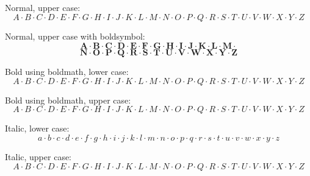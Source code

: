 \documentclass[12pt,a4paper]{article}
\theoremstyle{clearprint}
\begin{document}
\noindent 
Normal, upper case:
\begin{equation}
A \cdot B \cdot C \cdot D \cdot E \cdot F \cdot G \cdot H \cdot I \cdot J \cdot K \cdot L \cdot M \cdot N \cdot O \cdot P \cdot Q \cdot R \cdot S \cdot T \cdot U \cdot V \cdot W \cdot X \cdot Y \cdot Z
\end{equation}

\noindent 
Normal, upper case with boldsymbol:
\begin{equation}
\boldsymbol{A \cdot B \cdot C \cdot D \cdot E \cdot F \cdot G \cdot H \cdot I \cdot J \cdot K \cdot L \cdot M \cdot }
\end{equation}
\begin{equation}
\boldsymbol{N \cdot O \cdot P \cdot Q \cdot R \cdot S \cdot T \cdot U \cdot V \cdot W \cdot X \cdot Y \cdot Z}
\end{equation}

\noindent 
Bold using boldmath, lower case:\boldmath
\begin{equation}
A \cdot B \cdot C \cdot D \cdot E \cdot F \cdot G \cdot H \cdot I \cdot J \cdot K \cdot L \cdot M \cdot N \cdot O \cdot P \cdot Q \cdot R \cdot S \cdot T \cdot U \cdot V \cdot W \cdot X \cdot Y \cdot Z
\end{equation}\unboldmath

\noindent 
Bold using boldmath, upper case:\boldmath
\begin{equation}
A \cdot B \cdot C \cdot D \cdot E \cdot F \cdot G \cdot H \cdot I \cdot J \cdot K \cdot L \cdot M \cdot N \cdot O \cdot P \cdot Q \cdot R \cdot S \cdot T \cdot U \cdot V \cdot W \cdot X \cdot Y \cdot Z
\end{equation}\unboldmath

\noindent
Italic, lower case:
\begin{equation}
\mathit{a}\cdot \mathit{b}\cdot \mathit{c}\cdot \mathit{d}\cdot \mathit{e}\cdot \mathit{f}\cdot \mathit{g}\cdot \mathit{h}\cdot \mathit{i}\cdot \mathit{j}\cdot \mathit{k}\cdot \mathit{l}\cdot \mathit{m}\cdot \mathit{n}\cdot \mathit{o}\cdot \mathit{p}\cdot \mathit{q}\cdot \mathit{r}\cdot \mathit{s}\cdot \mathit{t}\cdot \mathit{u}\cdot \mathit{v}\cdot \mathit{w}\cdot \mathit{x}\cdot \mathit{y}\cdot \mathit{z}
\end{equation}

\noindent
Italic, upper case:
\begin{equation}
\mathit{A}\cdot \mathit{B}\cdot \mathit{C}\cdot \mathit{D}\cdot \mathit{E}\cdot \mathit{F}\cdot \mathit{G}\cdot \mathit{H}\cdot \mathit{I}\cdot \mathit{J}\cdot \mathit{K}\cdot \mathit{L}\cdot \mathit{M}\cdot \mathit{N}\cdot \mathit{O}\cdot \mathit{P}\cdot \mathit{Q}\cdot \mathit{R}\cdot \mathit{S}\cdot \mathit{T}\cdot \mathit{U}\cdot \mathit{V}\cdot \mathit{W}\cdot \mathit{X}\cdot \mathit{Y}\cdot \mathit{Z}
\end{equation}
\end{document}
